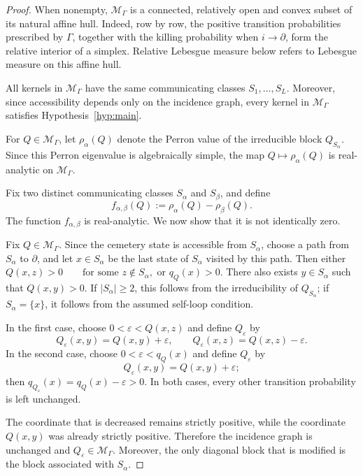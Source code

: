 \documentclass[10pt,letterpaper]{article}
\theoremstyle{compactplain}
\theoremstyle{compactdefinition}
\newcommand{\1}{\mathds{1}}
\begin{document}
\begin{proof}
When nonempty, \(\mathcal M_\Gamma\) is a connected, relatively open and
convex subset of its natural affine hull. Indeed, row by row, the positive
transition probabilities prescribed by \(\Gamma\), together with the killing
probability when \(i\to\partial\), form the relative interior of a simplex.
Relative Lebesgue measure below refers to Lebesgue measure on this affine
hull.

All kernels in \(\mathcal M_\Gamma\) have the same communicating classes
\(S_1,\ldots,S_L\). Moreover, since accessibility depends only on the
incidence graph, every kernel in \(\mathcal M_\Gamma\) satisfies
Hypothesis~\ref{hyp:main}.

For \(Q\in\mathcal M_\Gamma\), let \(\rho_\alpha(Q)\) denote the Perron
value of the irreducible block \(Q_{S_\alpha}\). Since this Perron
eigenvalue is algebraically simple, the map
\(
Q\longmapsto\rho_\alpha(Q)
\)
is real-analytic on \(\mathcal M_\Gamma\).

Fix two distinct communicating classes \(S_\alpha\) and \(S_\beta\), and
define
\[
f_{\alpha,\beta}(Q)
:=
\rho_\alpha(Q)-\rho_\beta(Q).
\]
The function \(f_{\alpha,\beta}\) is real-analytic. We now show that it is
not identically zero.

Fix \(Q\in\mathcal M_\Gamma\). Since the cemetery state is accessible from
\(S_\alpha\), choose a path from \(S_\alpha\) to \(\partial\), and let
\(x\in S_\alpha\) be the last state of \(S_\alpha\) visited by this path.
Then either
\(
Q(x,z)>0
\qquad\text{for some }z\notin S_\alpha,
\)
or
\(
q_Q(x)>0.
\)
There also exists \(y\in S_\alpha\) such that \(Q(x,y)>0\). If
\(|S_\alpha|\geq2\), this follows from the irreducibility of
\(Q_{S_\alpha}\); if \(S_\alpha=\{x\}\), it follows from the assumed
self-loop condition.

In the first case, choose
\(
0<\varepsilon<Q(x,z)
\)
and define \(Q_\varepsilon\) by
\[
Q_\varepsilon(x,y)=Q(x,y)+\varepsilon,
\qquad
Q_\varepsilon(x,z)=Q(x,z)-\varepsilon.
\]
In the second case, choose
\(
0<\varepsilon<q_Q(x)
\)
and define \(Q_\varepsilon\) by
\[
Q_\varepsilon(x,y)=Q(x,y)+\varepsilon;
\]
then
\(
q_{Q_\varepsilon}(x)=q_Q(x)-\varepsilon>0.
\)
In both cases, every other transition probability is left unchanged.

The coordinate that is decreased remains strictly positive, while the
coordinate \(Q(x,y)\) was already strictly positive. Therefore the incidence
graph is unchanged and
\(
Q_\varepsilon\in\mathcal M_\Gamma.
\)
Moreover, the only diagonal block that is modified is the block associated
with \(S_\alpha\).


\end{proof}
\end{document}
